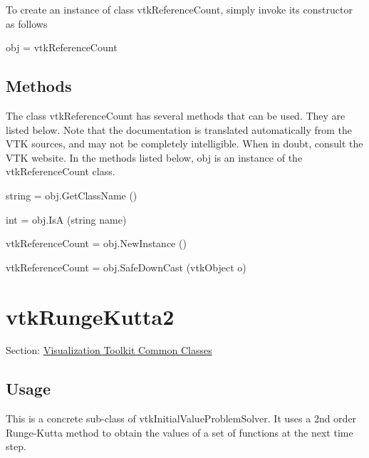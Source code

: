 To create an instance of class vtk\-Reference\-Count, simply invoke its constructor as follows \begin{DoxyVerb}  obj = vtkReferenceCount
\end{DoxyVerb}
 \hypertarget{vtkwidgets_vtkxyplotwidget_Methods}{}\subsection{Methods}\label{vtkwidgets_vtkxyplotwidget_Methods}
The class vtk\-Reference\-Count has several methods that can be used. They are listed below. Note that the documentation is translated automatically from the V\-T\-K sources, and may not be completely intelligible. When in doubt, consult the V\-T\-K website. In the methods listed below, {\ttfamily obj} is an instance of the vtk\-Reference\-Count class. 
\begin{DoxyItemize}
\item {\ttfamily string = obj.\-Get\-Class\-Name ()}  
\item {\ttfamily int = obj.\-Is\-A (string name)}  
\item {\ttfamily vtk\-Reference\-Count = obj.\-New\-Instance ()}  
\item {\ttfamily vtk\-Reference\-Count = obj.\-Safe\-Down\-Cast (vtk\-Object o)}  
\end{DoxyItemize}\hypertarget{vtkcommon_vtkrungekutta2}{}\section{vtk\-Runge\-Kutta2}\label{vtkcommon_vtkrungekutta2}
Section\-: \hyperlink{sec_vtkcommon}{Visualization Toolkit Common Classes} \hypertarget{vtkwidgets_vtkxyplotwidget_Usage}{}\subsection{Usage}\label{vtkwidgets_vtkxyplotwidget_Usage}
This is a concrete sub-\/class of vtk\-Initial\-Value\-Problem\-Solver. It uses a 2nd order Runge-\/\-Kutta method to obtain the values of a set of functions at the next time step.

